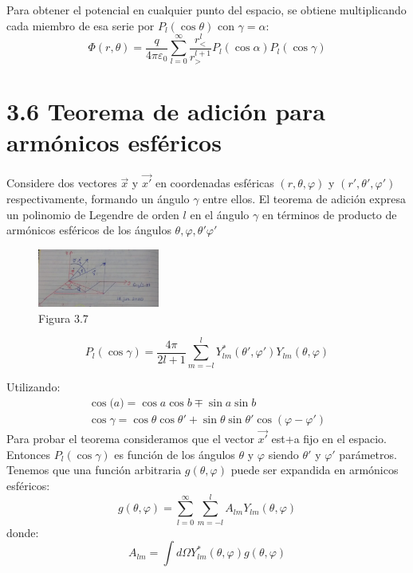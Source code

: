\documentclass{article}
\begin{document}
Para obtener el potencial en cualquier punto del espacio, se obtiene multiplicando cada miembro de esa serie por $P_l(\cos \theta)$ con $\gamma = \alpha$:
\begin{equation}
    \Phi(r, \theta) = \frac{q}{4 \pi \varepsilon_0} \sum_{l = 0}^{\infty} \frac{r_<^{l}}{r_>^{l + 1}} P_l(\cos \alpha) P_l(\cos \gamma)
\end{equation}

\section*{3.6 Teorema de adición para armónicos esféricos}
Considere dos vectores $\vec{x}$ y $\vec{x\prime}$ en coordenadas esféricas $(r, \theta,\varphi)$ y $(r\prime, \theta\prime,\varphi\prime)$ respectivamente, formando un ángulo $\gamma$ entre ellos. El teorema de adición expresa un polinomio de Legendre de orden $l$ en el ángulo $\gamma$ en términos de producto de armónicos esféricos de los ángulos $\theta,\varphi, \theta\prime \varphi\prime$

\begin{figure}[h]
\centering\includegraphics[width=4cm]{image4.png}
\caption{Figura 3.7}
\end{figure}


\begin{equation}
    P_l (\cos \gamma) = \frac{4\pi}{2l + 1} \sum_{m = -l}^{l} Y_{lm}^{*}(\theta\prime, \varphi\prime)Y_{lm}(\theta, \varphi)
\end{equation}

Utilizando:
\begin{equation}
    \begin{gathered}
    \cos (a\pmb) = \cos a \cos b \mp \sin a \sin b \\
    \cos \gamma = \cos\theta \cos \theta\prime + \sin \theta \sin \theta\prime \cos (\varphi - \varphi \prime)
    \end{gathered}
\end{equation}
Para probar el teorema consideramos que el vector $\vec{x\prime}$ est+a fijo en el espacio. Entonces $P_l ( \cos \gamma)$ es función de los ángulos $\theta$ y $\varphi$ siendo $\theta\prime$ y $\varphi\prime$ parámetros. Tenemos que una función arbitraria $g(\theta, \varphi)$ puede ser expandida en armónicos esféricos:
\begin{equation}
    g(\theta, \varphi) = \sum_{l = 0}^{\infty} \sum_{m = -l}^{l} A_{lm}Y_{lm}(\theta , \varphi)
\end{equation}
donde:
\begin{equation}
    A_{lm} = \int d\Omega Y_{lm}^{*}(\theta, \varphi) g(\theta, \varphi)
\end{equation}
\end{document}
